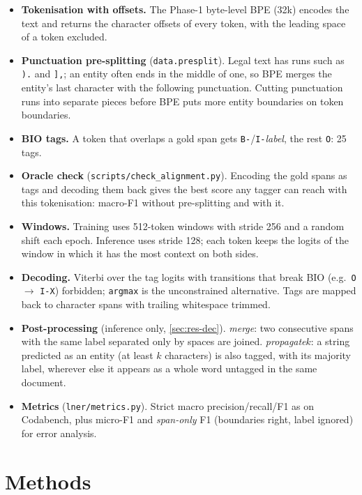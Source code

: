 \documentclass[11pt,a4paper]{article}
\newcommand{\code}[1]{\texttt{\small #1}}
\begin{document}
\begin{itemize}
  \item \textbf{Tokenisation with offsets.} The Phase-1 byte-level BPE (32k) encodes the text and returns the
  character offsets of every token, with the leading space of a token excluded.
  \item \textbf{Punctuation pre-splitting} (\code{data.presplit}). Legal text has runs such as \code{).} and
  \code{],}; an entity often ends in the middle of one, so BPE merges the entity's last character with the
  following punctuation.  Cutting punctuation runs into separate pieces before BPE puts more entity
  boundaries on token boundaries.
  \item \textbf{BIO tags.} A token that overlaps a gold span gets \code{B-}/\code{I-}\textit{label}, the rest
  \code{O}: 25 tags.
  \item \textbf{Oracle check} (\code{scripts/check\_alignment.py}). Encoding the gold spans as tags and decoding
  them back gives the best score any tagger can reach with this tokenisation: macro-F1 \oraclenosplit{}
  without pre-splitting and \oraclesplit{} with it.
  \item \textbf{Windows.} Training uses 512-token windows with stride 256 and a random shift each epoch.
  Inference uses stride 128; each token keeps the logits of the window in which it has the most context on
  both sides.
  \item \textbf{Decoding.} Viterbi over the tag logits with transitions that break BIO (e.g.\ \code{O}$\to$
  \code{I-X}) forbidden; \code{argmax} is the unconstrained alternative.  Tags are mapped back to character
  spans with trailing whitespace trimmed.
  \item \textbf{Post-processing} (inference only, \autoref{sec:res-dec}). \emph{merge}: two consecutive spans
  with the same label separated only by spaces are joined.  \emph{propagate}$k$: a string predicted as an
  entity (at least $k$ characters) is also tagged, with its majority label, wherever else it appears as a
  whole word untagged in the same document.
  \item \textbf{Metrics} (\code{lner/metrics.py}). Strict macro precision/recall/F1 as on Codabench, plus
  micro-F1 and \emph{span-only} F1 (boundaries right, label ignored) for error analysis.
\end{itemize}

\section{Methods}\label{sec:methods}
\end{document}
